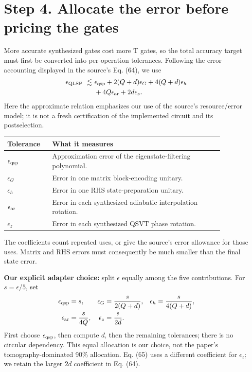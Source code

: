 \documentclass[11pt]{article}
\begin{document}
\newpage
\section*{Step 4. Allocate the error before pricing the gates}
More accurate synthesized gates cost more T gates, so the total accuracy target must first be converted into per-operation tolerances. Following the error accounting displayed in the source's Eq. (64), we use
\begin{align}\label{eq:error}
 \epsilon_{\rm QLSP}\ \lesssim\ &\epsilon_{\rm qsp}
 +2(Q+d)\epsilon_G+4(Q+d)\epsilon_h\nonumber\\
 &+4Q\epsilon_{\rm ar}+2d\epsilon_z.
\end{align}
Here the approximate relation emphasizes our use of the source's resource/error model; it is not a fresh certification of the implemented circuit and its postselection.

\begin{center}\small
\begin{tabular}{p{0.18\linewidth}p{0.7\linewidth}}
\toprule
Tolerance & What it measures\\\midrule
$\epsilon_{\rm qsp}$ & Approximation error of the eigenstate-filtering polynomial.\\
$\epsilon_G$ & Error in one matrix block-encoding unitary.\\
$\epsilon_h$ & Error in one RHS state-preparation unitary.\\
$\epsilon_{\rm ar}$ & Error in each synthesized adiabatic interpolation rotation.\\
$\epsilon_z$ & Error in each synthesized QSVT phase rotation.\\
\bottomrule
\end{tabular}
\end{center}
The coefficients count repeated uses, or give the source's error allowance for those uses. Matrix and RHS errors must consequently be much smaller than the final state error.

\textbf{Our explicit adapter choice:} split $\epsilon$ equally among the five contributions. For $s=\epsilon/5$, set
\begin{align}
 \epsilon_{\rm qsp}&=s,&
 \epsilon_G&=\frac{s}{2(Q+d)},&
 \epsilon_h&=\frac{s}{4(Q+d)},\\
 \epsilon_{\rm ar}&=\frac{s}{4Q},&
 \epsilon_z&=\frac{s}{2d}.&&
\end{align}
First choose $\epsilon_{\rm qsp}$, then compute $d$, then the remaining tolerances; there is no circular dependency. This equal allocation is our choice, not the paper's tomography-dominated 90\% allocation. Eq. (65) uses a different coefficient for $\epsilon_z$; we retain the larger $2d$ coefficient in Eq. (64).
\end{document}
